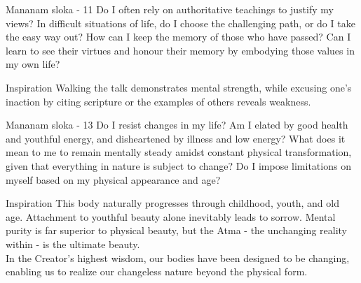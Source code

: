 \newpage
\begin{mananam}{\mananamfont Mananam sloka - 11}
\mananamtext Do I often rely on authoritative teachings to justify my views? In difficult situations of life, do I choose the challenging path, or do I take the easy way out? 
How can I keep the memory of those who have passed? Can I learn to see their virtues and honour their memory by embodying those  values in my own life? 
\end{mananam}
\WritingHand{}
\begin{inspiration}{\mananamfont Inspiration}
\mananamtext Walking the talk demonstrates mental strength, while excusing one’s inaction by citing scripture or the examples of others reveals weakness.
\end{inspiration}
\newpage

\newpage
\begin{mananam}{\mananamfont Mananam sloka - 13}
\mananamtext Do I resist changes in my life? Am I elated by good health and youthful energy, and disheartened by illness and low energy? What does it mean to me to remain mentally steady amidst constant physical transformation, given that everything in nature is subject to change? Do I impose limitations on myself based on my physical appearance and age? 
\end{mananam}
\WritingHand{}
\begin{inspiration}{\mananamfont Inspiration}
\mananamtext This body naturally progresses through childhood, youth, and old age. Attachment to youthful beauty alone inevitably leads to sorrow. Mental purity is far superior to physical beauty, but the Atma - the unchanging reality within - is the ultimate beauty.\\
In the Creator’s highest wisdom, our bodies have been designed to be changing, enabling us to realize our changeless nature beyond the physical form.
\end{inspiration}
\newpage

